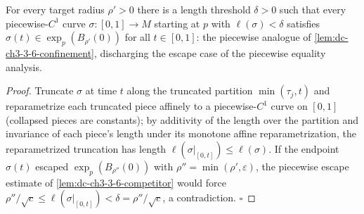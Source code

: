 \begin{lemma}
  \label{lem:dc-ch3-3-6-confinement-piecewise}
  \leanok
  For every target radius $\rho'>0$ there is a length threshold $\delta>0$
  such that every piecewise-$C^1$ curve $\sigma:[0,1]\to M$ starting at $p$
  with $\ell(\sigma)<\delta$ satisfies $\sigma(t)\in\exp_p(B_{\rho'}(0))$
  for all $t\in[0,1]$: the piecewise analogue of
  \cref{lem:dc-ch3-3-6-confinement}, discharging the escape case of the
  piecewise equality analysis.
\end{lemma}
\begin{proof}
  \leanok
  Truncate $\sigma$ at time $t$ along the truncated partition
  $\min(\tau_j,t)$ and reparametrize each truncated piece affinely to a
  piecewise-$C^1$ curve on $[0,1]$ (collapsed pieces are constants); by
  additivity of the length over the partition and invariance of each
  piece's length under its monotone affine reparametrization, the
  reparametrized truncation has length
  $\ell(\sigma|_{[0,t]})\le\ell(\sigma)$. If the endpoint $\sigma(t)$
  escaped $\exp_p(B_{\rho''}(0))$ with $\rho''=\min(\rho',\varepsilon)$, the
  piecewise escape estimate of \cref{lem:dc-ch3-3-6-competitor} would force
  $\rho''/\sqrt{c}\le\ell(\sigma|_{[0,t]})<\delta=\rho''/\sqrt{c}$, a
  contradiction. $\square$
\end{proof}

